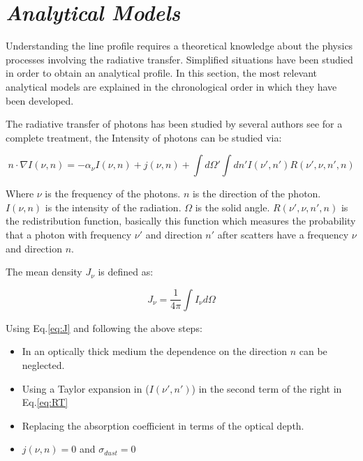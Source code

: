   

\section{\emph{Analytical Models}}\label{sec:analytic}

Understanding the \ly line profile requires a theoretical knowledge
about the physics processes involving the radiative transfer. Simplified 
situations have been studied in order to obtain an analytical 
 profile.  In this section, the most relevant 
analytical models are explained in the chronological order in which 
they have been developed. 

The radiative transfer of \ly photons has been studied by several authors
see \citep{RybickiLightman79} for a complete treatment, the Intensity
of \ly photons can be studied via:
 
\begin{equation}\label{eq:RT}
n\cdot\nabla I(\nu, n)= - \alpha_{\nu} I(\nu, n) + j(\nu, n) + \int d\Omega' \int dn' I(\nu', n') R(\nu', \nu, n', n)
\end{equation}

Where $\nu$ is the frequency of the \ly photons. $n$ is the direction 
of the \ly photon. $I(\nu, n)$ is the intensity
of the radiation. $\Omega$ is the solid angle. $R(\nu', \nu, n', n)$ 
is the redistribution function, basically this function which measures 
the probability that a \ly photon with frequency $\nu'$ and direction $n'$
after scatters have a frequency $\nu$ and direction $n$.

The mean density $J_{\nu}$ is defined as:

\begin{equation}\label{eq:J}
J_{\nu} = \dfrac{1}{4\pi}\int I_{\nu}d\Omega
\end{equation}


Using Eq.\ref{eq:J} and following the above steps:

\begin{itemize}
\item In an optically thick medium the dependence on the direction {\bf{$n$}} can 
be neglected.
\item Using a Taylor expansion in ($I(\nu', n')$) in the second term of the right in Eq.\ref{eq:RT} 
\item Replacing the absorption coefficient in terms of the optical depth.
\item $j(\nu, n)=0$ and $\sigma_{dust}=0$
\end{itemize}

